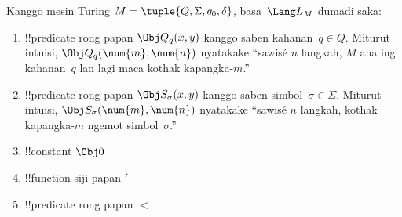 \documentclass[../../../include/open-logic-section]{subfiles}
\begin{document}
\begin{defn}
Kanggo mesin Turing $M = \tuple{Q, \Sigma, q_0, \delta}$,
basa~$\Lang L_M$ dumadi saka:
\begin{enumerate}
\item !!{predicate} rong papan $\Obj Q_q(x, y)$
  kanggo saben kahanan~$q \in Q$. Miturut intuisi,
  $\Obj Q_q(\num{m}, \num{n})$ nyatakake
  ``sawisé $n$ langkah, $M$ ana ing kahanan~$q$
  lan lagi maca kothak kapangka-$m$.''
\item !!{predicate} rong papan $\Obj S_\sigma(x, y)$
  kanggo saben simbol~$\sigma\in \Sigma$.
  Miturut intuisi, $\Obj S_\sigma(\num{m},
  \num{n})$ nyatakake ``sawisé $n$ langkah,
  kothak kapangka-$m$ ngemot simbol~$\sigma$.''
\item !!{constant} $\Obj 0$
\item !!{function} siji papan $\prime$
\item !!{predicate} rong papan $<$
\end{enumerate}
\end{defn}
\end{document}
